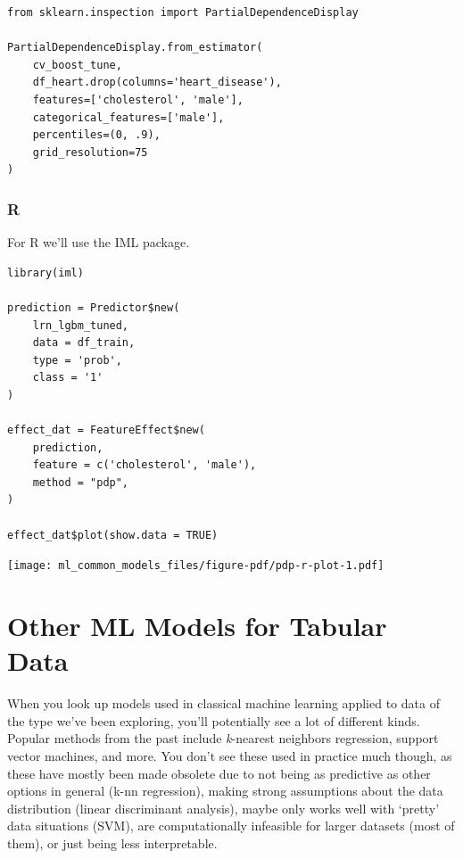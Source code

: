 \documentclass[
  letterpaper,
]{krantz}
\begin{document}
\begin{verbatim}
from sklearn.inspection import PartialDependenceDisplay

PartialDependenceDisplay.from_estimator(
    cv_boost_tune, 
    df_heart.drop(columns='heart_disease'), 
    features=['cholesterol', 'male'], 
    categorical_features=['male'], 
    percentiles=(0, .9),
    grid_resolution=75
)
\end{verbatim}

\subsubsection{R}

For R we'll use the IML package.

\begin{verbatim}
library(iml)

prediction = Predictor$new(
    lrn_lgbm_tuned, 
    data = df_train, 
    type = 'prob', 
    class = '1'
)

effect_dat = FeatureEffect$new(
    prediction, 
    feature = c('cholesterol', 'male'), 
    method = "pdp", 
)

effect_dat$plot(show.data = TRUE)
\end{verbatim}

\texttt{[image: ml\_common\_models\_files/figure-pdf/pdp-r-plot-1.pdf]}

\section{Other ML Models for Tabular
Data}\label{other-ml-models-for-tabular-data}

When you look up models used in classical machine learning applied to
data of the type we've been exploring, you'll potentially see a lot of
different kinds. Popular methods from the past include \emph{k}-nearest
neighbors regression, support vector machines, and more. You don't see
these used in practice much though, as these have mostly been made
obsolete due to not being as predictive as other options in general
(k-nn regression), making strong assumptions about the data distribution
(linear discriminant analysis), maybe only works well with `pretty' data
situations (SVM), are computationally infeasible for larger datasets
(most of them), or just being less interpretable.
\end{document}
